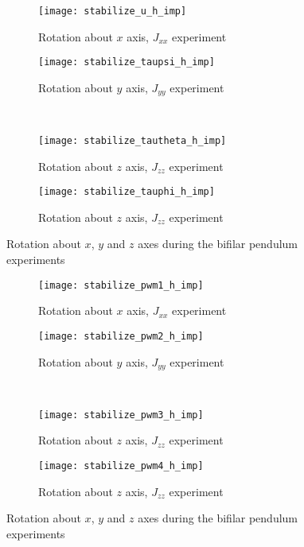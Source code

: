 \begin{appendices}
\begin{figure}[H]
\begin{subfigure}{.5\linewidth}
\centering
\texttt{[image: stabilize\_u\_h\_imp]}
\caption{Rotation about $x$ axis, $J_{xx}$ experiment}
\label{fig:stabilize_u_h_imp}
\end{subfigure}%
\begin{subfigure}{.5\linewidth}
\centering
\texttt{[image: stabilize\_taupsi\_h\_imp]}
\caption{Rotation about $y$ axis, $J_{yy}$ experiment}
\label{fig:stabilize_taupsi_h_imp}
\end{subfigure}\\[1ex]
\begin{subfigure}{0.5\linewidth}
\centering
\texttt{[image: stabilize\_tautheta\_h\_imp]}
\caption{Rotation about $z$ axis, $J_{zz}$ experiment}
\label{fig:stabilize_tautheta_h_imp}
\end{subfigure}
\begin{subfigure}{0.5\linewidth}
\centering
\texttt{[image: stabilize\_tauphi\_h\_imp]}
\caption{Rotation about $z$ axis, $J_{zz}$ experiment}
\label{fig:stabilize_tauphi_h_imp}
\end{subfigure}
\caption{Rotation about $x$, $y$ and $z$ axes during the bifilar pendulum experiments}
\label{fig:stabilize_control_h}
\end{figure}

\begin{figure}[H]
\begin{subfigure}{.5\linewidth}
\centering
\texttt{[image: stabilize\_pwm1\_h\_imp]}
\caption{Rotation about $x$ axis, $J_{xx}$ experiment}
\label{fig:stabilize_pwm_h_imp}
\end{subfigure}%
\begin{subfigure}{.5\linewidth}
\centering
\texttt{[image: stabilize\_pwm2\_h\_imp]}
\caption{Rotation about $y$ axis, $J_{yy}$ experiment}
\label{fig:stabilize_pwm2_h_imp}
\end{subfigure}\\[1ex]
\begin{subfigure}{0.5\linewidth}
\centering
\texttt{[image: stabilize\_pwm3\_h\_imp]}
\caption{Rotation about $z$ axis, $J_{zz}$ experiment}
\label{fig:stabilize_pwm3_h_imp}
\end{subfigure}
\begin{subfigure}{0.5\linewidth}
\centering
\texttt{[image: stabilize\_pwm4\_h\_imp]}
\caption{Rotation about $z$ axis, $J_{zz}$ experiment}
\label{fig:stabilize_pwm4_h_imp}
\end{subfigure}
\caption{Rotation about $x$, $y$ and $z$ axes during the bifilar pendulum experiments}
\label{fig:stabilize_pwm_h}
\end{figure}



\end{appendices}
